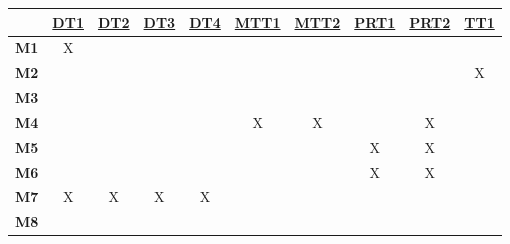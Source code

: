 \documentclass[12pt, titlepage]{article}
\begin{document}
\noindent
\begin{table}[H]
  \centering
  \begin{tabular}{|c|c|c|c|c|c|c|c|c|c|}
    \hline
                 & \hyperref[DT1]{DT1} & \hyperref[DT2]{DT2} & \hyperref[DT3]{DT3} & \hyperref[DT4]{DT4} & \hyperref[MTT1]{MTT1} & \hyperref[MTT2]{MTT2} & \hyperref[PRT1]{PRT1} & \hyperref[PRT2]{PRT2} & \hyperref[TT1]{TT1} \\
    \hline
    \textbf{M1}  & X                   &                     &                     &                     &                       &                       &                       &                       &                     \\ \hline
    \textbf{M2}  &                     &                     &                     &                     &                       &                       &                       &                       & X                   \\ \hline
    \textbf{M3}  &                     &                     &                     &                     &                       &                       &                       &                       &                     \\ \hline
    \textbf{M4}  &                     &                     &                     &                     & X                     & X                     &                       & X                     &                     \\ \hline
    \textbf{M5}  &                     &                     &                     &                     &                       &                       & X                     & X                     &                     \\ \hline
    \textbf{M6}  &                     &                     &                     &                     &                       &                       & X                     & X                     &                     \\ \hline
    \textbf{M7}  & X                   & X                   & X                   & X                   &                       &                       &                       &                       &                     \\ \hline
    \textbf{M8}  &                     &                     &                     &                     &                       &                       &                       &                       &                     \\ \hline

\end{tabular}
\end{table}
\end{document}
